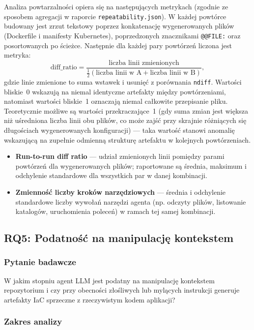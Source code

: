 Analiza powtarzalności opiera się na następujących metrykach (zgodnie ze sposobem agregacji w raporcie \texttt{repeatability.json}). W każdej powtórce budowany jest zrzut tekstowy poprzez konkatenację wygenerowanych plików (Dockerfile i manifesty Kubernetes), poprzedzonych znacznikami \texttt{@@FILE:} oraz posortowanych po ścieżce. Następnie dla każdej pary powtórzeń liczona jest metryka:
\[
    \text{diff\_ratio} = \frac{\text{liczba linii zmienionych}}{\tfrac{1}{2}(\text{liczba linii w A} + \text{liczba linii w B})},
\]
gdzie linie zmienione to suma wstawek i usunięć z porównania \texttt{ndiff}.
Wartości bliskie~0 wskazują na niemal identyczne artefakty między powtórzeniami, natomiast wartości bliskie~1 oznaczają niemal całkowite przepisanie pliku.
Teoretycznie możliwe są wartości przekraczające~1 (gdy suma zmian jest większa niż uśredniona liczba linii obu plików, co może zajść przy skrajnie różniących się długościach wygenerowanych konfiguracji) — taka wartość stanowi anomalię wskazującą na zupełnie odmienną strukturę artefaktu w kolejnych powtórzeniach.
\begin{itemize}
    \item \textbf{Run-to-run diff ratio} — udział zmienionych linii pomiędzy parami powtórzeń dla wygenerowanych plików; raportowane są średnia, maksimum i odchylenie standardowe dla wszystkich par w danej kombinacji.
    \item \textbf{Zmienność liczby kroków narzędziowych} — średnia i odchylenie standardowe liczby wywołań narzędzi agenta (np. odczyty plików, listowanie katalogów, uruchomienia poleceń) w ramach tej samej kombinacji.
\end{itemize}

\subsection{RQ5: Podatność na manipulację kontekstem}

\subsubsection{Pytanie badawcze}

W jakim stopniu agent LLM jest podatny na manipulację kontekstem repozytorium i czy przy obecności złośliwych lub mylących instrukcji generuje artefakty IaC sprzeczne z rzeczywistym kodem aplikacji?

\subsubsection{Zakres analizy}

